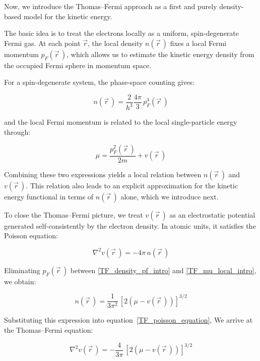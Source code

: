 Now, we introduce the Thomas--Fermi approach as a first and purely density-based model for the kinetic energy.

The basic idea is to treat the electrons locally as a uniform, spin-degenerate Fermi gas.
At each point $\vec{r}$, the local density $n(\vec{r}\,)$ fixes a local Fermi momentum $p_F(\vec{r}\,)$, which allows us to estimate the kinetic energy density from the occupied Fermi sphere in momentum space.

For a spin-degenerate system, the phase-space counting gives:

\begin{equation}
    n(\vec{r}\,) = \frac{2}{h^3}\frac{4\pi}{3}\,p_F^3(\vec{r}\,)
\label{TF_density_pf_intro}
\end{equation}

and the local Fermi momentum is related to the local single-particle energy through:

\begin{equation}
    \mu = \frac{p_F^2(\vec{r}\,)}{2m}+v(\vec{r}\,)
\label{TF_mu_local_intro}
\end{equation}

Combining these two expressions yields a local relation between $n(\vec{r}\,)$ and $v(\vec{r}\,)$.
This relation also leads to an explicit approximation for the kinetic energy functional in terms of $n(\vec{r}\,)$ alone, which we introduce next.

To close the Thomas--Fermi picture, we treat $v(\vec{r}\,)$ as an electrostatic potential generated self-consistently by the electron density.
In atomic units, it satisfies the Poisson equation:

\begin{equation}
    \nabla^2 v(\vec{r}\,) = -4\pi\,n(\vec{r}\,)
\label{TF_poisson_equation}
\end{equation}

Eliminating $p_F(\vec{r}\,)$ between \eqref{TF_density_pf_intro} and \eqref{TF_mu_local_intro}, we obtain:

\begin{equation}
    n(\vec{r}\,) = \frac{1}{3\pi^2}\,[2(\mu - v(\vec{r}\,))]^{3/2}
\label{TF_density_muV}
\end{equation}

Substituting this expression into equation~\eqref{TF_poisson_equation},
We arrive at the Thomas--Fermi equation:

\begin{equation}
    \nabla^2 v(\vec{r}\,)=-\frac{4}{3\pi}\,[2(\mu-v(\vec{r}\,))]^{3/2}
\label{thomas_fermi_equation}
\end{equation}

